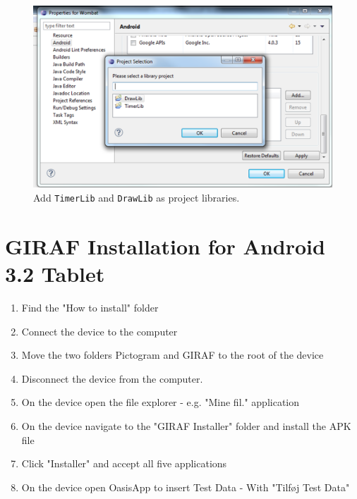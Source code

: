 \begin{figure}[H]
	\centering
		\includegraphics[scale=0.2]{Images/how_to_wombat/add_timer_draw_lib.png}
	\caption{Add \texttt{TimerLib} and \texttt{DrawLib} as project libraries.}
	\label{fig:add_timer_draw_lib}
\end{figure}

\clearpage
\section{GIRAF Installation for Android 3.2 Tablet}
\begin{enumerate}
	\item Find the "How to install" folder
	\item Connect the device to the computer
	\item	Move the two folders Pictogram and GIRAF to the root of the device
	\item	Disconnect the device from the computer.
	\item On the device open the file explorer - e.g. "Mine fil." application
	\item	On the device navigate to the "GIRAF Installer" folder and install the APK file
  \item Click "Installer" and accept all five applications
	\item On the device open OasisApp to insert Test Data - With "Tilføj Test Data"
\end{enumerate}